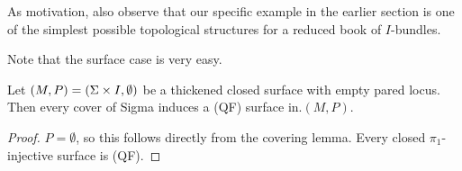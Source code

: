 As motivation, also observe that our specific example in the earlier section is
one of the simplest possible topological structures for a reduced book of
$I$-bundles.

Note that the surface case is very easy.

\begin{prop}

Let $(M,P) = (\Sigma \times I, \emptyset)$ be a thickened closed surface with
empty pared locus. Then every cover of Sigma induces a (QF) surface in.$(M,P)$.

\end{prop}

\begin{proof}

$P = \emptyset$, so this follows directly from the covering lemma. Every closed
$\pi_1$-injective surface is (QF).

\end{proof}
